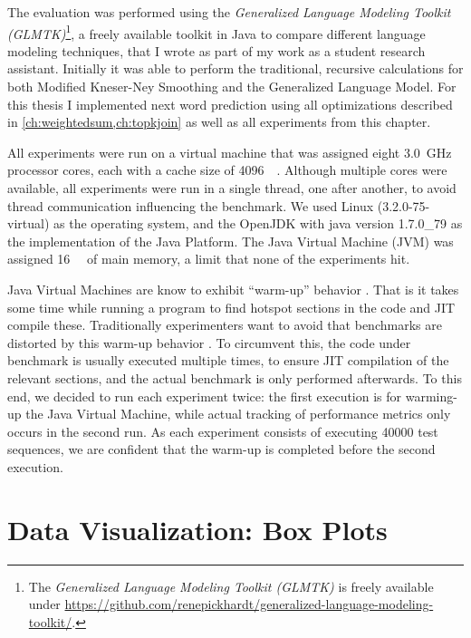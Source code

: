 The evaluation was performed using the \emph{Generalized Language Modeling
Toolkit (GLMTK)}\footnote{The \emph{Generalized Language Modeling Toolkit
(GLMTK)} is freely available under
\mbox{\url{https://github.com/renepickhardt/generalized-language-modeling-toolkit/}}.},
a freely available toolkit in Java to compare different language modeling
techniques, that I wrote as part of my work as a student research assistant.
Initially it was able to perform the traditional, recursive calculations for
both Modified Kneser-Ney Smoothing and the Generalized Language Model.
For this thesis I implemented next word prediction using all optimizations
described in \cref{ch:weightedsum,ch:topkjoin} as well as all experiments from
this chapter.

All experiments were run on a virtual machine that was assigned eight
\SI{3.0}{\giga\hertz} processor cores, each with a cache size of
\SI{4096}{\kibi\byte}.
Although multiple cores were available, all experiments were run in a single
thread, one after another, to avoid thread communication influencing the
benchmark.
We used Linux (3.2.0-75-virtual) as the operating system, and
the OpenJDK with java version 1.7.0\_79 as the implementation of the
Java Platform.
The Java Virtual Machine (JVM) was assigned \SI{16}{\gibi\byte} of main memory,
a limit that none of the experiments hit.

Java Virtual Machines are know to exhibit \enquote{warm-up} behavior \noref.
That is it takes some time while running a program to find hotspot sections
in the code and JIT compile these.
Traditionally experimenters want to avoid that benchmarks are distorted by
this warm-up behavior \noref.
To circumvent this, the code under benchmark is usually executed multiple times,
to ensure JIT compilation of the relevant sections, and the actual benchmark
is only performed afterwards.
To this end, we decided to run each experiment twice:
the first execution is for warming-up the Java Virtual Machine, while actual
tracking of performance metrics only occurs in the second run.
As each experiment consists of executing \num{40000} test sequences, we are
confident that the warm-up is completed before the second execution.


\section{Data Visualization: Box Plots}
\label{sec:boxplot}

